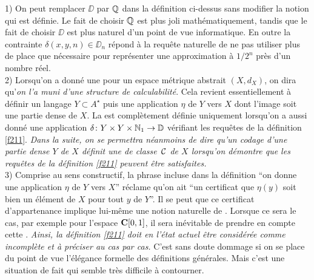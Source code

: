 \begin{fremarks} \label{f212}
1) On peut remplacer  $\DD$  par  $\mathbb {Q}$  dans la définition ci-dessus sans 
modifier la notion qui est définie. 
Le fait de choisir  $\mathbb {Q}$  est plus joli mathématiquement, tandis que le fait de choisir   $\DD$  est plus naturel d'un point de vue informatique. 
En outre la contrainte  $\delta(x,y,n) \in \DD_n$  répond à la requête naturelle de ne pas utiliser plus de place que nécessaire pour représenter une approximation à $1/2^n$  près d'un nombre réel.\\
2) Lorsqu'on a donné une \rp  pour un espace métrique abstrait  $(X,d_X)$, 
on dira qu'{\em on l'a muni d'une structure de calculabilité}. Cela revient essentiellement à définir un langage  
$Y \subset  A^{\star}$  puis une application $\eta$ de  $Y$  vers  $X$  dont l'image soit une partie dense de  $X$. La \pres est complètement définie uniquement lorsqu'on a aussi donné une application  
$\delta \colon  Y \times  Y \times  \mathbb {N}_1  \rightarrow   \mathbb {D}$  
vérifiant les requêtes de la définition \ref{f211}. 
{\em Dans la suite, on se permettra néanmoins de dire qu'un codage d'une 
partie dense  $Y$  de  $X$  définit une \pres de classe~${{\cal C}}$   de  $X$  
lorsqu'on démontre que les requêtes de la définition \ref{f211} peuvent être satisfaites.} \\
3)	Comprise au sens constructif, la phrase incluse dans la définition 	
	``on donne une application  $\eta$  de  $Y$  vers $X$''	 
réclame qu'on ait	 
	``un certificat que  $\eta(y)$  soit bien un élément de  $X$  pour tout $y$  de $Y$''. 	
Il se peut que ce certificat d'appartenance implique lui-même une notion 
naturelle de \com. Lorsque ce sera le cas, par exemple pour l'espace  
${{\bf C}[0,1]}$, il sera inévitable de prendre en compte cette \com. 
{\em Ainsi, la définition \ref{f211} doit en l'état actuel être considérée comme incomplète et à préciser au cas par cas.} C'est sans doute dommage si on se place du point de vue l'élégance formelle des définitions 
générales. Mais c'est une situation de fait qui semble très difficile à 
contourner. 
\end{fremarks}

